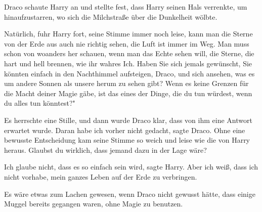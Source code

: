 Draco schaute Harry an und stellte fest, dass Harry seinen Hals verrenkte, um
hinaufzustarren, wo sich die Milchstraße über die Dunkelheit wölbte.

\glqq Natürlich\grqq{}, fuhr Harry fort, seine Stimme immer noch leise, \glqq
kann man die Sterne von der Erde aus auch nie richtig sehen, die Luft ist immer
im Weg. Man muss schon von woanders her schauen, wenn man das Echte sehen will,
die Sterne, die hart und hell brennen, wie ihr wahres Ich. Haben Sie sich jemals
gewünscht, Sie könnten einfach in den Nachthimmel aufsteigen, Draco, und sich
ansehen, was es um andere Sonnen als unsere herum zu sehen gibt? Wenn es keine
Grenzen für die Macht deiner Magie gäbe, ist das eines der Dinge, die du tun
würdest, wenn du alles tun könntest?"

Es herrschte eine Stille, und dann wurde Draco klar, dass von ihm eine Antwort
erwartet wurde. \glqq Daran habe ich vorher nicht gedacht\grqq{}, sagte Draco.
Ohne eine bewusste Entscheidung kam seine Stimme so weich und leise wie die von
Harry heraus. \glqq Glaubst du wirklich, dass jemand dazu in der Lage
wäre?\grqq{}

\glqq Ich glaube nicht, dass es so einfach sein wird\grqq{}, sagte Harry. \glqq
Aber ich weiß, dass ich nicht vorhabe, mein ganzes Leben auf der Erde zu
verbringen.\grqq{}

Es wäre etwas zum Lachen gewesen, wenn Draco nicht gewusst hätte, dass einige
Muggel bereits gegangen waren, ohne Magie zu benutzen.

